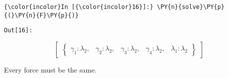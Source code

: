     \begin{Verbatim}[commandchars=\\\{\}]
{\color{incolor}In [{\color{incolor}16}]:} \PY{n}{solve}\PY{p}{(}\PY{n}{F}\PY{p}{)}
\end{Verbatim}
\texttt{\color{outcolor}Out[{\color{outcolor}16}]:}


        \begin{equation*}
        \begin{bmatrix}\begin{Bmatrix}\gamma_{1} : \lambda_{2}, & \gamma_{2} : \lambda_{2}, & \gamma_{3} : \lambda_{2}, & \gamma_{4} : \lambda_{2}, & \lambda_{1} : \lambda_{2}\end{Bmatrix}\end{bmatrix}
        \end{equation*}



    Every force must be the same.





